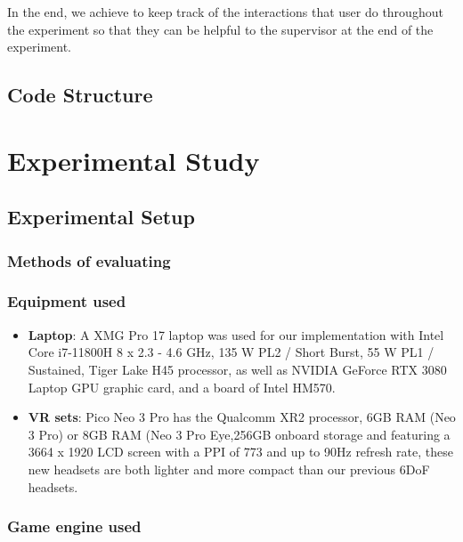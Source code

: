 \documentclass[conference]{IEEEtran}
\begin{document}
In the end, we achieve to keep track of the interactions that user do throughout the experiment so that they can be helpful to the supervisor at the end of the experiment.

\subsection{Code Structure}


\section{Experimental Study}


\subsection{Experimental Setup}


\subsubsection{Methods of evaluating}


\subsubsection{Equipment used}

\begin{itemize}
    \item \textbf{Laptop}: A XMG Pro 17 laptop was used for our implementation with Intel Core i7-11800H 8 x 2.3 - 4.6 GHz, 135 W PL2 / Short Burst, 55 W PL1 / Sustained, Tiger Lake H45 processor, as well as NVIDIA GeForce RTX 3080 Laptop GPU graphic card, and a board of Intel HM570.
    
    
    \item \textbf{VR sets}: Pico Neo 3 Pro has the Qualcomm XR2 processor, 6GB RAM (Neo 3 Pro) or 8GB RAM (Neo 3 Pro Eye,256GB onboard storage and featuring a 3664 x 1920 LCD screen with a PPI of 773 and up to 90Hz refresh rate, these new headsets are both lighter and more compact than our previous 6DoF headsets.

    
\end{itemize}

\subsubsection{Game engine used}
\end{document}
